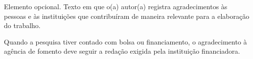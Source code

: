 

Elemento opcional. Texto em que o(a) autor(a) registra agradecimentos às pessoas e às instituições que contribuíram de maneira relevante para a elaboração do trabalho.

Quando a pesquisa tiver contado com bolsa ou financiamento, o agradecimento à agência de fomento deve seguir a redação exigida pela instituição financiadora.
